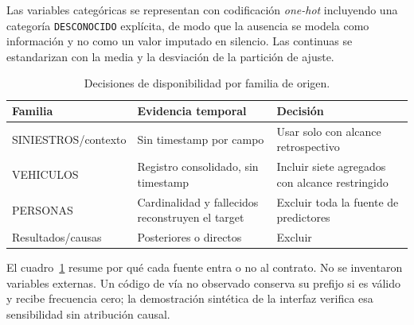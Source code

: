 Las variables categóricas se representan con codificación \emph{one-hot} incluyendo una categoría \texttt{DESCONOCIDO} explícita, de modo que la ausencia se modela como información y no como un valor imputado en silencio. Las continuas se estandarizan con la media y la desviación de la partición de ajuste.

\begin{table}[tbp]\centering\caption{Decisiones de disponibilidad por familia de origen.}\label{tab:disponibilidad}\begin{tabularx}{\textwidth}{p{3cm}p{4cm}X}\toprule
Familia & Evidencia temporal & Decisión \\\midrule
SINIESTROS/\allowbreak contexto & Sin timestamp por campo & Usar solo con alcance retrospectivo \\
VEHICULOS & Registro consolidado, sin timestamp & Incluir siete agregados con alcance restringido \\
PERSONAS & Cardinalidad y fallecidos reconstruyen el target & Excluir toda la fuente de predictores \\
Resultados/\allowbreak causas & Posteriores o directos & Excluir \\\bottomrule
\end{tabularx}\end{table}

El cuadro~\ref{tab:disponibilidad} resume por qué cada fuente entra o no al contrato. No se inventaron variables externas. Un código de vía no observado conserva su prefijo si es válido y recibe frecuencia cero; la demostración sintética de la interfaz verifica esa sensibilidad sin atribución causal.

